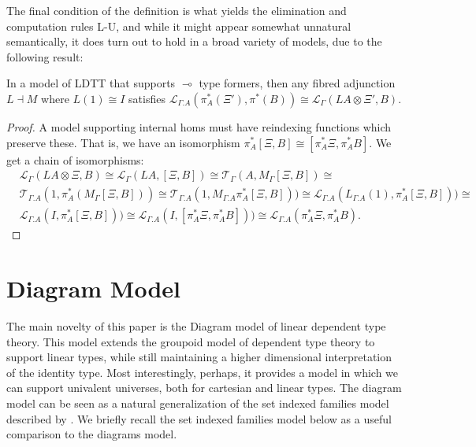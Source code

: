 \documentclass[a4paper,english]{lipics-v2018}
\begin{document}
The final condition of the definition is what yields the elimination and computation rules L-U, and while it might appear somewhat unnatural semantically, it does turn out to hold in a broad variety of models, due to the following result:
\begin{theorem}In a model of LDTT that supports $\multimap$ type formers, then any fibred adjunction $L \dashv M$ where $L(1) \cong I$ satisfies $\mathcal{L}_{\Gamma.A}(\pi^*_A(\Xi'), \pi^*(B)) \cong \mathcal{L}_{\Gamma}(LA \otimes \Xi', B)$.
  \begin{proof}
    A model supporting internal homs must have reindexing functions which preserve these. That is, we have an isomorphism $\pi_A^*[\Xi, B] \cong [\pi_A^*\Xi, \pi^*_AB]$. We get a chain of isomorphisms:
\[
\begin{split}
&\mathcal{L}_{\Gamma}(LA \otimes \Xi, B) \cong 
\mathcal{L}_{\Gamma}(LA, [\Xi, B]) \cong 
\mathcal{T}_{\Gamma}(A, M_{\Gamma}[\Xi, B]) \cong \\
&\mathcal{T}_{\Gamma.A}(1, \pi_A^*(M_{\Gamma}[\Xi, B])) \cong 
\mathcal{T}_{\Gamma.A}(1, M_{\Gamma.A}\pi_A^*[\Xi, B])) \cong 
\mathcal{L}_{\Gamma.A}(L_{\Gamma.A}(1), \pi_A^*[\Xi, B])) \cong \\
&\mathcal{L}_{\Gamma.A}(I, \pi_A^*[\Xi, B])) \cong 
\mathcal{L}_{\Gamma.A}(I, [\pi_A^*\Xi, \pi_A^*B])) \cong 
\mathcal{L}_{\Gamma.A}(\pi_A^*\Xi, \pi_A^*B).
\end{split}
\]
  \end{proof}
\end{theorem}
\section{Diagram Model}\label{models}
The main novelty of this paper is the Diagram model of linear dependent type theory. This model extends the groupoid model of dependent type theory \cite{hofmann1998} to support linear types, while still maintaining a higher dimensional interpretation of the identity type. Most interestingly, perhaps, it provides a model in which we can support univalent universes, both for cartesian and linear types. The diagram model can be seen as a natural generalization of the set indexed families model described by \cite{vakar14}. We briefly recall the set indexed families model below as a useful comparison to the diagrams model.
\end{document}
